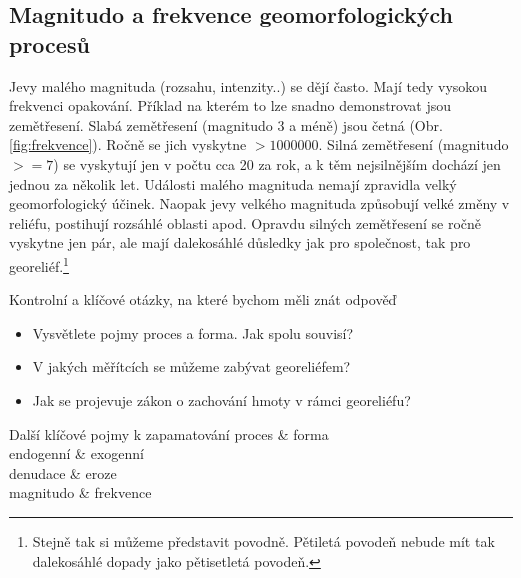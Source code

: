 \subsection{Magnitudo a frekvence geomorfologických procesů}
Jevy malého magnituda (rozsahu, intenzity..) se dějí často. Mají tedy vysokou frekvenci opakování. Příklad na kterém to lze snadno demonstrovat jsou zemětřesení. Slabá zemětřesení (magnitudo 3 a méně) jsou četná (Obr. \ref{fig:frekvence}). Ročně se jich vyskytne $> 1000000$. Silná zemětřesení (magnitudo $>=7$) se vyskytují jen v počtu cca 20 za rok, a k těm nejsilnějším dochází jen jednou za několik let. 
Události malého magnituda nemají zpravidla velký geomorfologický účinek. Naopak jevy velkého magnituda způsobují velké změny v reliéfu, postihují rozsáhlé oblasti apod. Opravdu silných zemětřesení se ročně vyskytne jen pár, ale mají dalekosáhlé důsledky jak pro společnost, tak pro georeliéf.\footnote*{Stejně tak si můžeme představit povodně. Pětiletá povodeň nebude mít tak dalekosáhlé dopady jako pětisetletá povodeň.}


\newpage
\onecolumn
\begin{boxotazky}{Kontrolní a klíčové otázky, na které bychom měli znát odpověď}
	\begin{itemize}
		\item Vysvětlete pojmy proces a forma. Jak spolu souvisí?
		\item V jakých měřítcích se můžeme zabývat georeliéfem?
		\item Jak se projevuje zákon o zachování hmoty v rámci georeliéfu?
		
	\end{itemize}
\end{boxotazky}

\begin{boxslovnik}{Další klíčové pojmy k zapamatování}
	proces & forma \\
	endogenní & exogenní \\
	denudace & eroze \\
	magnitudo & frekvence
\end{boxslovnik}
\twocolumn